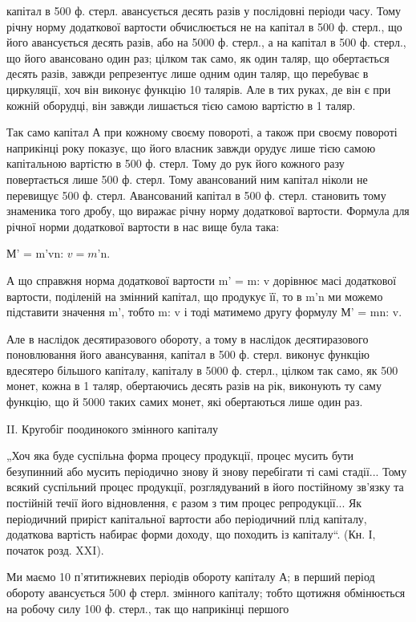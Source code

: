 \parcont{}  %
капітал в 500 ф. стерл. авансується десять разів у послідовні періоди часу.
Тому річну норму додаткової вартости обчислюється не на капітал в 500 ф.
стерл., що його авансується десять разів, або на 5000 ф. стерл., а на капітал
в 500 ф. стерл., що його авансовано один раз; цілком так само,
як один таляр, що обертається десять разів, завжди репрезентує лише
одним один таляр, що перебуває в циркуляції, хоч він виконує функцію
10 талярів. Але в тих руках, де він є при кожній оборудці, він завжди
лишається тією самою вартістю в 1 таляр.

Так само капітал А при кожному своєму повороті, а також при своєму
повороті наприкінці року показує, що його власник завжди орудує
лише тією самою капітальною вартістю в 500 ф. стерл. Тому до рук його
кожного разу повертається лише 500 ф. стерл. Тому авансований ним капітал
ніколи не перевищує 500 ф. стерл. Авансований капітал в 500 ф. стерл.
становить тому знаменика того дробу, що виражає річну норму додаткової
вартости. Формула для річної норми додаткової вартости в нас
вище була така:

М' = m'vn: $v = m$'n.

А що справжня норма додаткової вартости m' = m: v дорівнює масі додаткової
вартости, поділеній на змінний капітал, що продукує її, то в
m'n ми можемо підставити значення m', тобто m: v і тоді матимемо другу
формулу М' = mn: v.

Але в наслідок десятиразового обороту, а тому в наслідок десятиразового
поновлювання його авансування, капітал в 500 ф. стерл. виконує
функцію вдесятеро більшого капіталу, капіталу в 5000 ф. стерл., цілком так
само, як 500 монет, кожна в 1 таляр, обертаючись десять разів на рік,
виконують ту саму функцію, що й 5000 таких самих монет, які обертаються
лише один раз.

II. Кругобіг поодинокого змінного капіталу

„Хоч яка буде суспільна форма процесу продукції, процес мусить
бути безупинний або мусить періодично знову й знову перебігати ті самі
стадії... Тому всякий суспільний процес продукції, розглядуваний в
його постійному зв’язку та постійній течії його відновлення, є разом з
тим процес репродукції... Як періодичний приріст капітальної вартости
або періодичний плід капіталу, додаткова вартість набирає форми доходу,
що походить із капіталу“. (Кн. І, початок розд. XXI).

Ми маємо 10 п’ятитижневих періодів обороту капіталу А; в перший
період обороту авансується 500 ф стерл. змінного капіталу; тобто щотижня
обмінюється на робочу силу 100 ф. стерл., так що наприкінці першого
\parbreak{}  %
